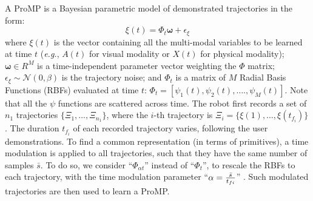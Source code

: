 \documentclass[runningheads,a4paper]{llncs}
\begin{document}
A ProMP is a Bayesian parametric model of demonstrated trajectories in the form: 
\begin{equation}
\label{eq:xi}
\xi(t) = \Phi_t \boldsymbol{\omega} + \epsilon_\xi
\end{equation}
where $\xi(t)$ is the vector containing all the multi-modal variables to be learned at time $t$ (\textit{e.g.}, $A(t)$ for visual modality or $X(t)$ for physical modality);
$\boldsymbol{\omega} \in R^M$ is a time-independent parameter vector weighting the $\Phi$ matrix; $\epsilon_\xi \sim \mathcal{N}(0, \beta) $ is the trajectory noise; and $\Phi_t$ is a matrix of $M$ Radial Basis Functions (RBFs) evaluated at time $t$:
$ \Phi_{t}=[\psi_{1}(t), \psi_{2}(t), \ldots., \psi_{M}(t)]$.
Note that all the $\psi$ functions are scattered across time. 
The robot first records a set of $n_1$ trajectories $\{\Xi_1,\ldots, \Xi_{n_1} \}$, where the $i$-th trajectory is $\Xi_i = \{\xi(1), \ldots, \xi(t_{f_i})\}$. 
The duration $t_{f_i}$ of each recorded trajectory varies, following the user demonstrations. 
To find a common representation (in terms of primitives), a time modulation is applied to all trajectories, such that they have the same number of samples $\bar{s}$.
To do so, we consider ``$\Phi_{\alpha t}$'' instead of ``$\Phi_{t}$'', to rescale the RBFs to each trajectory, with the time modulation parameter ``$\alpha = {\bar{s} \over t_{fi}}$'' .
Such modulated trajectories are then used to learn a ProMP.
\end{document}
